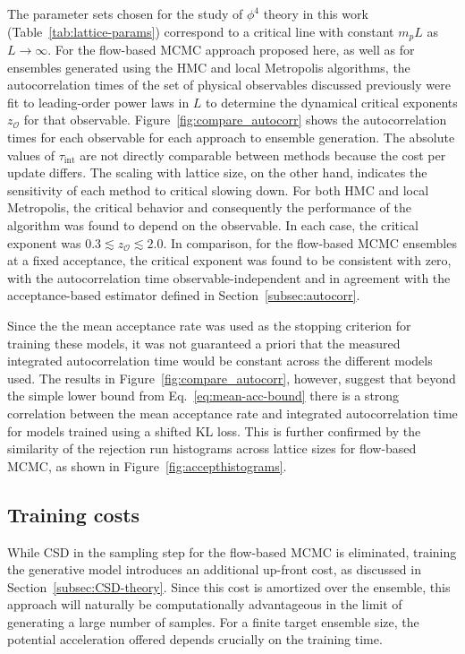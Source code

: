 The parameter sets chosen for the study of $\phi^4$ theory in this work (Table~\ref{tab:lattice-params}) correspond to a critical line with constant $m_pL$ as $L\rightarrow \infty$. For the flow-based MCMC approach proposed here, as well as for ensembles generated using the HMC and local Metropolis algorithms, the autocorrelation times of the set of physical observables discussed previously were fit to leading-order power laws in $L$ to determine the dynamical critical exponents $z_\mathcal{O}$ for that observable.
%
Figure~\ref{fig:compare_autocorr} shows the autocorrelation times for each observable for each approach to ensemble generation. The absolute values of $\tau_\text{int}$ are not directly comparable between methods because the cost per update differs. The scaling with lattice size, on the other hand, indicates the sensitivity of each method to critical slowing down. For both HMC and local Metropolis, the critical behavior and consequently the performance of the algorithm was found to depend on the observable. In each case, the critical exponent was $0.3\lesssim z_\mathcal{O}\lesssim 2.0$. In comparison, for the flow-based MCMC ensembles at a fixed acceptance, the critical exponent was found to be consistent with zero, with the autocorrelation time observable-independent and in agreement with the acceptance-based estimator defined in Section~\ref{subsec:autocorr}.

Since the the mean acceptance rate was used as the stopping criterion for training these models, it was not guaranteed a priori that the measured integrated autocorrelation time would be constant across the different models used. The results in Figure~\ref{fig:compare_autocorr}, however, suggest that beyond the simple lower bound from Eq.~\eqref{eq:mean-acc-bound} there is a strong correlation between the mean acceptance rate and integrated autocorrelation time for models trained using a shifted KL loss. This is further confirmed by the similarity of the rejection run histograms across lattice sizes for flow-based MCMC, as shown in Figure~\ref{fig:accepthistograms}.

\subsection{Training costs}
\label{subsec:training-cost}
While CSD in the sampling step for the flow-based MCMC is eliminated, training the generative model introduces an additional up-front cost, as discussed in Section~\ref{subsec:CSD-theory}. Since this cost is amortized over the ensemble, this approach will naturally be computationally advantageous in the limit of generating a large number of samples. For a finite target ensemble size, the potential acceleration offered depends crucially on the training time.

